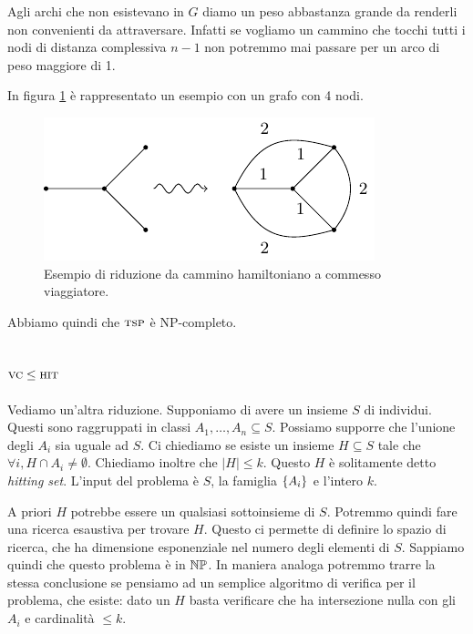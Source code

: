 Agli archi che non esistevano in $G$ diamo un peso abbastanza grande da renderli non convenienti da
attraversare. Infatti se vogliamo un cammino che tocchi tutti i nodi di distanza complessiva $n-1$
non potremmo mai passare per un arco di peso maggiore di 1.

In figura \ref{img:HAMTSP} è rappresentato un esempio con un grafo con 4 nodi.

\begin{figure}[h]
    \begin{center}
        \includegraphics{./img/NPClass/HAMTSP.pdf}
        \caption{Esempio di riduzione da cammino hamiltoniano a commesso viaggiatore.}
        \label{img:HAMTSP}
    \end{center}
\end{figure}


Abbiamo quindi che $\textsc{tsp}$ è NP-completo.

\subsection{$\textsc{vc} \leq \textsc{hit}$}

Vediamo un'altra riduzione. Supponiamo di avere un insieme $S$ di individui. Questi sono raggruppati
in classi $A_{1},\dotsc,A_{n} \subseteq S$. Possiamo supporre che l'unione degli $A_{i}$ sia uguale
ad $S$. Ci chiediamo se esiste un insieme $H \subseteq S$ tale che $\forall i, H \cap A_{i} \not=
\emptyset$. Chiediamo inoltre che $|H| \leq k$. Questo $H$ è solitamente detto \textit{hitting
set}. L'input del problema è $S$, la famiglia $\left\{A_{i}\right\}$ e l'intero $k$.

A priori $H$ potrebbe essere un qualsiasi sottoinsieme di $S$. Potremmo quindi fare una ricerca
esaustiva per trovare $H$. Questo ci permette di definire lo spazio di ricerca, che ha dimensione
esponenziale nel numero degli elementi di $S$. Sappiamo quindi che questo problema è in $\mathbb{NP}$.
In maniera analoga potremmo trarre la stessa conclusione se pensiamo ad un semplice algoritmo di
verifica per il problema, che esiste: dato un $H$ basta verificare che ha intersezione nulla con gli
$A_{i}$ e cardinalità $\leq k$.

